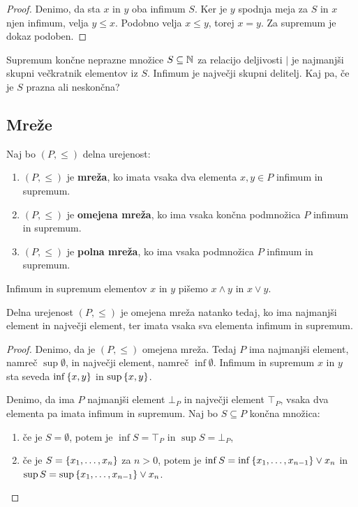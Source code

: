 \begin{proof}
  Denimo, da sta $x$ in $y$ oba infimum $S$. Ker je $y$ spodnja meja za
  $S$ in $x$ njen infimum, velja $y \leq x$. Podobno velja $x \leq y$, torej $x = y$. Za
  supremum je dokaz podoben.
\end{proof}

\begin{zgled}
  Supremum končne neprazne množice $S \subseteq \mathbb{N}$ za relacijo deljivosti $\mid$
  je najmanjši skupni večkratnik elementov iz $S$. Infimum je največji skupni
  delitelj. Kaj pa, če je $S$ prazna ali neskončna?
\end{zgled}

\subsection{Mreže}

\begin{definicija}
  Naj bo $(P, {\leq})$ delna urejenost:
  \begin{enumerate}
  \item $(P, \leq)$ je \textbf{mreža}, ko imata vsaka dva elementa $x, y \in P$ infimum in supremum.

  \item $(P, \leq)$ je \textbf{omejena mreža}, ko ima vsaka končna podmnožica $P$ infimum in supremum.

  \item $(P, \leq)$ je \textbf{polna mreža}, ko ima vsaka podmnožica $P$ infimum in supremum.
  \end{enumerate}
  Infimum in supremum elementov $x$ in $y$ pišemo $x \land y$ in $x \lor y$.
\end{definicija}

\begin{izrek}
  Delna urejenost $(P, {\leq})$ je omejena mreža natanko tedaj, ko ima
  najmanjši element in največji element, ter imata vsaka sva elementa infimum in supremum.
\end{izrek}

\begin{proof}
  Denimo, da je $(P, \leq)$ omejena mreža. Tedaj $P$ ima najmanjši element, namreč
  $\sup \emptyset$, in največji element, namreč $\inf \emptyset$. Infimum in supremum $x$ in $y$ sta seveda $\inf \left\{x, y\right\}$ in $\sup \left\{x, y\right\}$.

  Denimo, da ima $P$ najmanjši element $\bot_P$ in največji element $\top_P$, vsaka dva
  elementa pa imata infimum in supremum. Naj bo $S \subseteq P$ končna množica:
  \begin{enumerate}
  \item če je $S = \emptyset$, potem je $\inf S = \top_P$ in $\sup S = \bot_P$,
  \item če je $S = \left\{x_1, \ldots, x_n\right\}$ za $n > 0$, potem je $\inf S = \inf \left\{x_1, \ldots, x_{n-1}\right\} \lor x_n$ in $\sup S = \sup \left\{x_1, \ldots, x_{n-1}\right\} \lor x_n$.
  \end{enumerate}
\end{proof}

